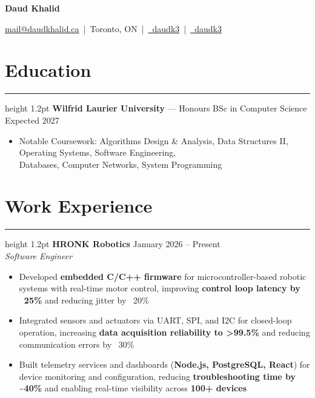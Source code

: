 \documentclass[11pt]{article}
\newcommand{\divider}{\hrule height 1.2pt \vspace{6pt}}
\newcommand{\name}[1]{{\huge\bfseries #1}}
\newcommand{\contact}[1]{\normalsize #1}
\newcommand{\rolelocdates}[3]{\textbf{#1} \hfill #3\\\textit{#2}}
\begin{document}
    \pagestyle{empty}
	\RaggedRight
	
	\name{Daud Khalid}\par
    \contact{
    \href{mailto:mail@daudkhalid.ca}{mail@daudkhalid.ca} \,|\, 
    Toronto, ON \,|\, 
    \href{https://github.com/daudk3}{\faGithub\ daudk3} \,|\, 
    \href{https://www.linkedin.com/in/daudk3/}{\faLinkedin\ daudk3}
    }
    \vspace{0pt}

	\section{Education}
    \divider
    \textbf{Wilfrid Laurier University} — Honours BSc in Computer Science \hfill Expected 2027\\
    \vspace{2pt}
    \begin{itemize}
    	\item Notable Coursework: Algorithms Design \& Analysis, Data Structures II, Operating Systems, Software Engineering, \\ Databases, Computer Networks, System Programming
    \end{itemize}


	\section{Work Experience}
	    \divider
    \vspace{6pt}
    \rolelocdates{HRONK Robotics}{Software Engineer}{January 2026 -- Present}
    \begin{itemize}
          \item Developed \textbf{embedded C/C++ firmware} for microcontroller-based robotic systems with real-time motor control, improving \textbf{control loop latency by ~25\%} and reducing jitter by ~20\%
          \item Integrated sensors and actuators via UART, SPI, and I2C for closed-loop operation, increasing \textbf{data acquisition reliability to >99.5\%} and reducing communication errors by ~30\%
          \item Built telemetry services and dashboards (\textbf{Node.js, PostgreSQL, React}) for device monitoring and configuration, reducing \textbf{troubleshooting time by \textasciitilde40\%} and enabling real-time visibility across \textbf{100+ devices}
        \end{itemize}
    
\end{document}
